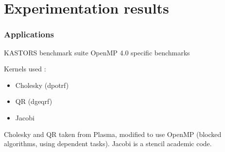 \documentclass[xcolor={usenames,dvipsnames,svgnames,table}, aspectratio=43]{beamer}
\begin{document}





\section{Experimentation results}


\begin{frame}
\frametitle{Applications}

\begin{block}{KASTORS benchmark suite}
  OpenMP 4.0 specific benchmarks

  Kernels used :
  \begin{itemize}
    \item Cholesky (dpotrf)
    \item QR (dgeqrf)
    \item Jacobi
  \end{itemize}

  Cholesky and QR taken from Plasma, modified to use OpenMP (blocked algorithms, using dependent tasks).
  Jacobi is a stencil academic code.
\end{block}

\end{frame}
\end{document}
